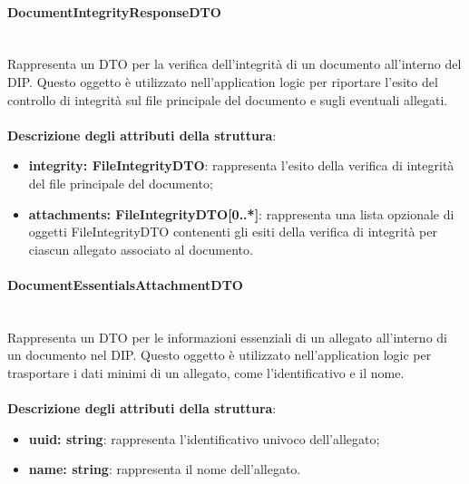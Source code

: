 \documentclass[a4paper,12pt]{article}
\begin{document}
{{{                \paragraph{DocumentIntegrityResponseDTO}\label{par:DocumentIntegrityResponseDTO}\mbox{}\\
                Rappresenta un DTO per la verifica dell'integrità di un documento all'interno del DIP. Questo oggetto è utilizzato nell'application logic per riportare l'esito del controllo di integrità sul file principale del documento e sugli eventuali allegati.\\
                \\
                \textbf{Descrizione degli attributi della struttura}:
                \begin{itemize}
                    \item \textbf{integrity: FileIntegrityDTO}: rappresenta l'esito della verifica di integrità del file principale del documento;
                    \item \textbf{attachments: FileIntegrityDTO[0..*]}: rappresenta una lista opzionale di oggetti FileIntegrityDTO contenenti gli esiti della verifica di integrità per ciascun allegato associato al documento.
                \end{itemize}
                \paragraph{DocumentEssentialsAttachmentDTO}\label{par:DocumentEssentialsAttachmentDTO}\mbox{}\\
                Rappresenta un DTO per le informazioni essenziali di un allegato all'interno di un documento nel DIP. Questo oggetto è utilizzato nell'application logic per trasportare i dati minimi di un allegato, come l'identificativo e il nome.\\
                \\
                \textbf{Descrizione degli attributi della struttura}:
                \begin{itemize}
                    \item \textbf{uuid: string}: rappresenta l'identificativo univoco dell'allegato;
                    \item \textbf{name: string}: rappresenta il nome dell'allegato.
                \end{itemize}
}}}
\end{document}
